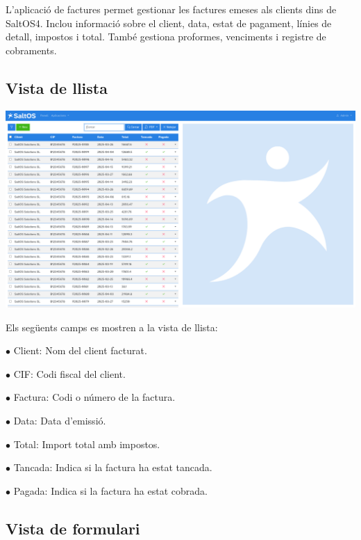\documentclass[a4paper]{article}
\begin{document}
L'aplicació de factures permet gestionar les factures emeses als clients dins de SaltOS4.
Inclou informació sobre el client, data, estat de pagament, línies de detall, impostos i total.
També gestiona proformes, venciments i registre de cobraments.

\hypertarget{toc138}{}
\subsection{Vista de llista}

\begin{center}\includegraphics[width=1\textwidth]{../ujest/snaps/test-screenshots-js-screenshots-sales-invoices-list-ca-es-1-snap.png}\end{center}

Els següents camps es mostren a la vista de llista:

\begin{compactitem}
\item[\color{myblue}$\bullet$] Client: Nom del client facturat.
\item[\color{myblue}$\bullet$] CIF: Codi fiscal del client.
\item[\color{myblue}$\bullet$] Factura: Codi o número de la factura.
\item[\color{myblue}$\bullet$] Data: Data d'emissió.
\item[\color{myblue}$\bullet$] Total: Import total amb impostos.
\item[\color{myblue}$\bullet$] Tancada: Indica si la factura ha estat tancada.
\item[\color{myblue}$\bullet$] Pagada: Indica si la factura ha estat cobrada.
\end{compactitem}

\hypertarget{toc139}{}
\subsection{Vista de formulari}
\end{document}
